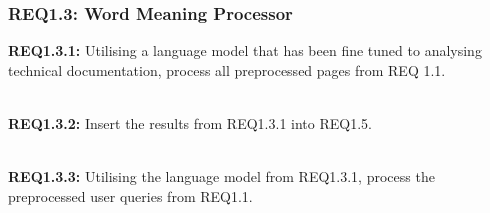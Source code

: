 \subsubsection{REQ1.3: Word Meaning Processor}

\textbf{REQ1.3.1: }Utilising a language model that has been fine tuned to analysing technical documentation, process all preprocessed pages from REQ 1.1.\par
\textbf{\\REQ1.3.2: }Insert the results from REQ1.3.1 into REQ1.5.\par
\textbf{\\REQ1.3.3: }Utilising the language model from REQ1.3.1, process the preprocessed user queries from REQ1.1.
